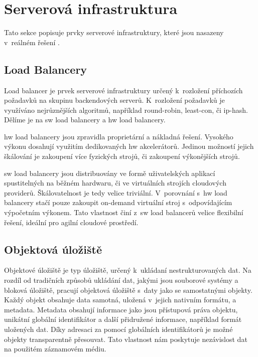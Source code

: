\section{Serverová infrastruktura}\label{sub:server-architecture}

Tato sekce popisuje prvky serverové infrastruktury, které jsou nasazeny v~reálném řešení \bso{}.

\subsection{Load Balancery}\label{sub:load-balancing}

Load balancer\cite{load-balancer} je prvek serverové infrastruktury určený k~rozložení příchozích požadavků na skupinu backendových serverů. K~rozložení požadavků je využíváno nejrůznějších algoritmů, například \gls{round-robin}, \gls{least-con}, či \gls{ip-hash}. Dělíme je na \acrshort{sw} load balancery a \acrshort{hw} load balancery. 

\acrshort{hw} load balancery jsou zpravidla proprietární a nákladná řešení. Vysokého výkonu dosahují využitím dedikovaných \acrshort{hw} akcelerátorů. Jedinou možností jejich škálování je zakoupení více fyzických strojů, či zakoupení výkonějších strojů.

\acrshort{sw} load balancery jsou distribuovány ve formě uživatelských aplikací spustitelných na běžném hardwaru, či ve virtuálních strojích cloudových providerů.
Škálovatelnost je tedy velice triviální.
V~porovnání s~\acrshort{hw} load balancery stačí pouze zakoupit \gls{on-demand} virtuální stroj s~odpovídajícím výpočetním výkonem.
Tato vlastnost činí z~\acrshort{sw} load balancerů velice flexibilní řešení, ideální pro agilní cloudové prostředí.

\subsection{Objektová úložiště}


Objektové úložiště je typ úložiště, určený k~ukládaní nestrukturovaných dat. Na rozdíl od tradičních způsobů ukládání dat, jakými jsou souborové systémy a bloková úložiště, pracují objektová úložiště\cite{object-storage} s~daty jako se samostatnými objekty. Každý objekt obsahuje data samotná, uložená v~jejich nativním formátu, a metadata. Metadata obsahují informace jako jsou přístupová práva objektu, unikátní globální identifikátor a další přidružené informace, například formát uložených dat. Díky adresaci za pomocí globálních identifikátorů je možné objekty transparentně přesouvat. Tato vlastnost nám poskytuje nezávislost dat na použitém záznamovém médiu.

